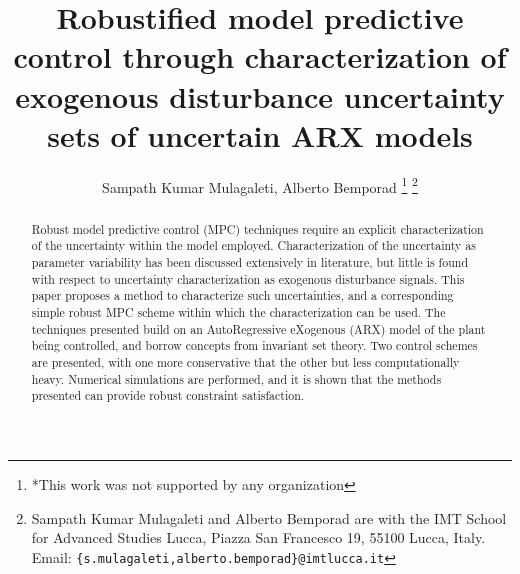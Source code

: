 \documentclass[letterpaper, 10 pt, conference]{ieeeconf}  %
\title{\LARGE \bf
Robustified model predictive control through characterization of exogenous disturbance uncertainty sets of uncertain ARX models
}
\author{Sampath Kumar Mulagaleti, Alberto Bemporad%
\thanks{*This work was not supported by any organization}%
\thanks{Sampath Kumar Mulagaleti and Alberto Bemporad are with
		the IMT School for Advanced Studies Lucca, Piazza San Francesco 19,
		55100 Lucca, Italy. 
		 Email: 
	   {\tt\small \{s.mulagaleti,alberto.bemporad\}@imtlucca.it}}%
}
\begin{document}
\maketitle
\thispagestyle{empty}
\pagestyle{empty}


\begin{abstract}

Robust model predictive control (MPC) techniques require an explicit characterization of the uncertainty within the model employed. Characterization of the uncertainty as parameter variability has been discussed extensively in literature, but little is found with respect to uncertainty characterization as exogenous disturbance signals. This paper proposes a method to characterize such uncertainties, and a corresponding simple robust MPC scheme within which the characterization can be used. The techniques presented build on an AutoRegressive eXogenous (ARX) model of the plant being controlled, and borrow concepts from invariant set theory. Two control schemes are presented, with one more conservative that the other but less computationally heavy. Numerical simulations are performed, and it is shown that the methods presented can provide robust constraint satisfaction.

\end{abstract}


\end{document}
